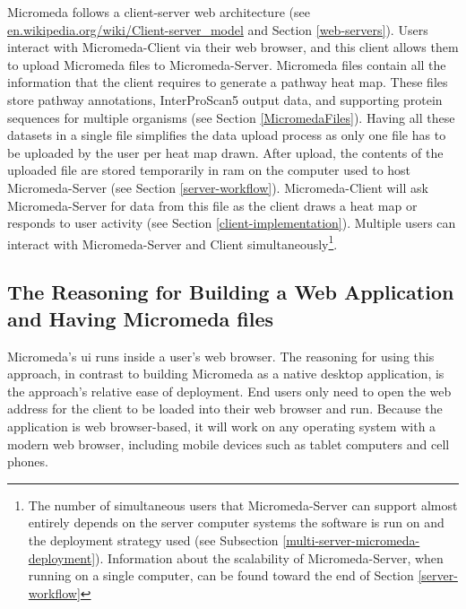 Micromeda follows a client-server web architecture \cite{svobodova1985client} 
(see 
\href{http://en.wikipedia.org/wiki/Client-server_model}{en.wikipedia.org/wiki/Client-server\_model} 
and Section \ref{web-servers}). Users interact with Micromeda-Client via their 
web browser, and this client allows them to upload Micromeda files to 
Micromeda-Server. Micromeda files contain all the information that the client 
requires to generate a pathway heat map. These files store pathway annotations, 
InterProScan5 output data, and supporting protein sequences for multiple 
organisms (see Section \ref{MicromedaFiles}). Having all these datasets in a 
single file simplifies the data upload process as only one file has to be 
uploaded by the user per heat map drawn. After upload, the contents of the 
uploaded file are stored temporarily in \gls{ram} on the computer used to host 
Micromeda-Server (see Section \ref{server-workflow}). Micromeda-Client will ask 
Micromeda-Server for data from this file as the client draws a heat map or 
responds to user activity (see Section \ref{client-implementation}). Multiple 
users can interact with Micromeda-Server and Client simultaneously\footnote{The 
number of simultaneous users that Micromeda-Server can support almost entirely 
depends on the server computer systems the software is run on and the deployment 
strategy used (see Subsection \ref{multi-server-micromeda-deployment}). 
Information about the scalability of Micromeda-Server, when running on a single 
computer, can be found toward the end of Section \ref{server-workflow}}.

\subsection{The Reasoning for Building a Web Application and Having Micromeda 
files} \label{why-micromeda-files}

Micromeda's \gls{ui} runs inside a user's web browser. The reasoning for using 
this approach, in contrast to building Micromeda as a native desktop 
application, is the approach's relative ease of deployment. End users only need 
to open the web address for the client to be loaded into their web browser and 
run. Because the application is web browser-based, it will work on any operating 
system with a modern web browser, including mobile devices such as tablet 
computers and cell phones.

